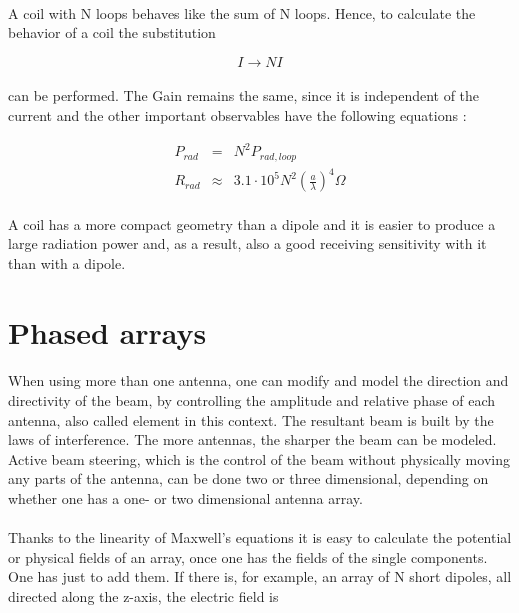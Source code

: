 \documentclass[a4paper,10pt]{thesis}
\begin{document}
\paragraph*{}
A coil with N loops behaves like the sum of N loops. Hence, to calculate the behavior of a coil the substitution

\begin{equation}\label{coil_subst}
I\rightarrow NI
\end{equation}


\paragraph*{}
can be performed. The Gain remains the same, since it is independent of the current and the other important observables have the following equations :

\begin{eqnarray}
P_{rad} &=&N^2 P_{rad,loop} \\
R_{rad} &\approx& 3.1 \cdot 10^5  N^2 \left(\frac{a}{\lambda} \right)^4 \Omega
\end{eqnarray}

\paragraph*{}
A coil has a more compact geometry than a dipole and it is easier to produce a large radiation power and, as a result, also a good receiving sensitivity with it than with a dipole.

\section{\textbf{Phased arrays}}
\paragraph*{}
When using more than one antenna, one can modify and model the direction and directivity of the beam, by controlling the amplitude and relative phase of each antenna, also called element in this context. The resultant beam is built by the laws of interference. The more antennas, the sharper the beam can be modeled. Active beam steering, which is the control of the beam without physically moving any parts of the antenna, can be done two or three dimensional, depending on whether one has a one- or two dimensional antenna array.

\paragraph*{}
Thanks to the linearity of Maxwell's equations it is easy to calculate the potential or physical fields of an array, once one has the fields of the single components. One has just to add them. If there is, for example, an array of N short dipoles, all directed along the z-axis, the electric field is
\end{document}
